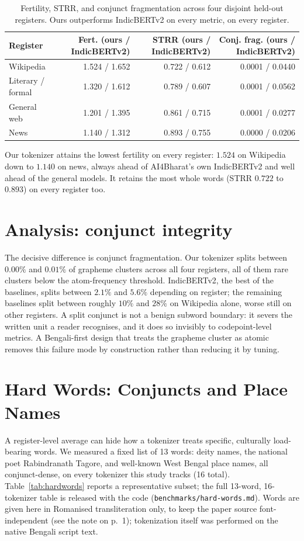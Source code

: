 \documentclass[11pt]{article}
\begin{document}
\begin{table}[t]
\centering
\small
\begin{tabular}{lrrr}
\toprule
Register & Fert. (ours / IndicBERTv2) & STRR (ours / IndicBERTv2) & Conj. frag. (ours / IndicBERTv2) \\
\midrule
Wikipedia & 1.524 / 1.652 & 0.722 / 0.612 & 0.0001 / 0.0440 \\
Literary / formal & 1.320 / 1.612 & 0.789 / 0.607 & 0.0001 / 0.0562 \\
General web & 1.201 / 1.395 & 0.861 / 0.715 & 0.0001 / 0.0277 \\
News & 1.140 / 1.312 & 0.893 / 0.755 & 0.0000 / 0.0206 \\
\bottomrule
\end{tabular}
\caption{Fertility, STRR, and conjunct fragmentation across four disjoint
held-out registers. Ours outperforms IndicBERTv2 on every metric, on every register.}
\label{tab:registers}
\end{table}

Our tokenizer attains the lowest fertility on every register: $1.524$ on
Wikipedia down to $1.140$ on news, always ahead of AI4Bharat's own IndicBERTv2
and well ahead of the general models. It retains the most whole words (STRR
$0.722$ to $0.893$) on every register too.

\section{Analysis: conjunct integrity}
The decisive difference is conjunct fragmentation. Our tokenizer splits between
$0.00\%$ and $0.01\%$ of grapheme clusters across all four registers, all of
them rare clusters below the atom-frequency threshold. IndicBERTv2, the best of
the baselines, splits between $2.1\%$ and $5.6\%$ depending on register; the
remaining baselines split between roughly $10\%$ and $28\%$ on Wikipedia alone,
worse still on other registers. A split
conjunct is not a benign subword boundary: it severs the written unit a reader
recognises, and it does so invisibly to codepoint-level metrics. A
Bengali-first design that treats the grapheme cluster as atomic removes this
failure mode by construction rather than reducing it by tuning.

\section{Hard Words: Conjuncts and Place Names}
\label{sec:hardwords}
A register-level average can hide how a tokenizer treats specific,
culturally load-bearing words. We measured a fixed list of 13 words: deity
names, the national poet Rabindranath Tagore, and well-known West Bengal
place names, all conjunct-dense, on every tokenizer this study tracks (16
total). Table~\ref{tab:hardwords} reports a representative subset; the full
13-word, 16-tokenizer table is released with the code
(\texttt{benchmarks/hard-words.md}). Words are given here in Romanised
transliteration only, to keep the paper source font-independent (see the
note on p.~1); tokenization itself was performed on the native Bengali
script text.
\end{document}
